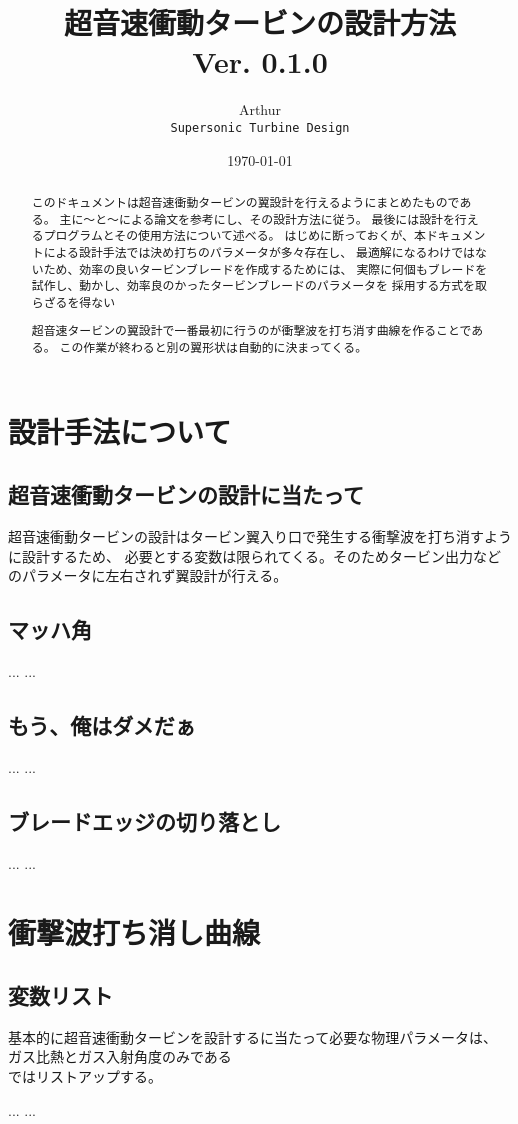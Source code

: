 \documentclass[a4j,10pt,oneside,openany]{jsbook}
\title{{\Huge \textbf{超音速衝動タービンの設計方法}}\\ {\small Ver. 0.1.0}}
\author{Arthur\\ \texttt{Supersonic Turbine Design}}
\date{\today}
\begin{document}
%
%
\maketitle
\frontmatter
\tableofcontents
%
%
\mainmatter

\chapter{設計手法について}
\begin{abstract}

このドキュメントは超音速衝動タービンの翼設計を行えるようにまとめたものである。
主に〜と〜による論文を参考にし、その設計方法に従う。
最後には設計を行えるプログラムとその使用方法について述べる。
はじめに断っておくが、本ドキュメントによる設計手法では決め打ちのパラメータが多々存在し、
最適解になるわけではないため、効率の良いタービンブレードを作成するためには、
実際に何個もブレードを試作し、動かし、効率良のかったタービンブレードのパラメータを
採用する方式を取らざるを得ない

\end{abstract}

\section{超音速衝動タービンの設計に当たって}
超音速衝動タービンの設計はタービン翼入り口で発生する衝撃波を打ち消すように設計するため、
必要とする変数は限られてくる。そのためタービン出力などのパラメータに左右されず翼設計が行える。

\section{マッハ角}
...
...

\section{もう、俺はダメだぁ}
...
...

\section{ブレードエッジの切り落とし}
...
...

\chapter{衝撃波打ち消し曲線}
\begin{abstract}
超音速タービンの翼設計で一番最初に行うのが衝撃波を打ち消す曲線を作ることである。
この作業が終わると別の翼形状は自動的に決まってくる。
\end{abstract}

\section{変数リスト}
基本的に超音速衝動タービンを設計するに当たって必要な物理パラメータは、
ガス比熱とガス入射角度のみである\\

ではリストアップする。

\begin{thebibliography}{20}
...
...
\end{thebibliography}

\newpage
\printindex
%
%
\end{document}
